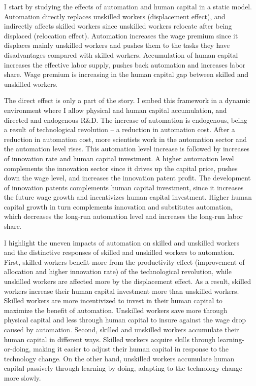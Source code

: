 \documentclass[12pt]{article}
\begin{document}
I start by studying the effects of automation and human capital in a static model. Automation directly replaces unskilled workers (displacement effect), and indirectly affects skilled workers since unskilled workers relocate after being displaced (relocation effect). Automation increases the wage premium since it displaces mainly unskilled workers and pushes them to the tasks they have disadvantages compared with skilled workers. Accumulation of human capital increases the effective labor supply, pushes back automation and increases labor share. Wage premium is increasing in the human capital gap between skilled and unskilled workers. 

The direct effect is only a part of the story. I embed this framework in a dynamic environment where I allow physical and human capital accumulation, and directed and endogenous R\&D. The increase of automation is endogenous, being a result of technological revolution -- a reduction in automation cost. After a reduction in automation cost, more scientists work in the automation sector and the automation level rises. This automation level increase is followed by increases of  innovation rate and human capital investment. A higher automation level complements the innovation sector since it drives up the capital price, pushes down the wage level, and increases the innovation patent profit. The development of innovation patents complements human capital investment, since it increases the future wage growth and incentivizes human capital investment. Higher human capital growth in turn complements innovation and substitutes automation, which decreases the long-run automation level and increases the long-run labor share. 

I highlight the uneven impacts of automation on skilled and unskilled workers and the distinctive responses of skilled and unskilled workers to automation. First, skilled workers benefit more from the productivity effect (improvement of allocation and higher innovation rate) of the technological revolution, while unskilled workers are affected more by the displacement effect. As a result, skilled workers increase their human capital investment more than unskilled workers. Skilled workers are more incentivized to invest in their human capital to maximize the benefit of automation. Unskilled workers save more through physical capital and less through human capital to insure against the wage drop caused by automation. Second, skilled and unskilled workers accumulate their human capital in different ways. Skilled workers acquire skills through learning-or-doing, making it easier to adjust their human capital in response to the technology change. On the other hand, unskilled workers accumulate human capital passively through learning-by-doing, adapting to the technology change more slowly.  
\end{document}
